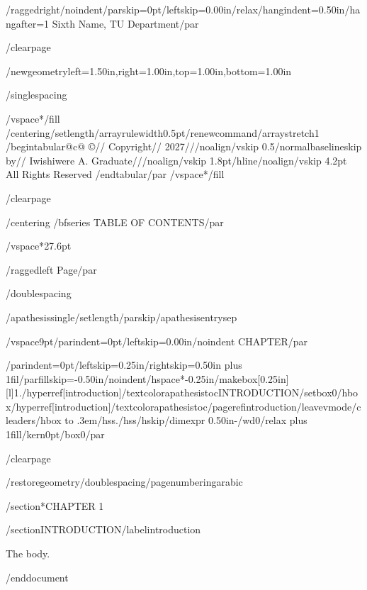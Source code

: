 {/raggedright/noindent/parskip=0pt/leftskip=0.00in/relax/hangindent=0.50in/hangafter=1
Sixth Name, TU Department/par}

/clearpage

/newgeometry{left=1.50in,right=1.00in,top=1.00in,bottom=1.00in}

/singlespacing

/vspace*{/fill}
{/centering/setlength{/arrayrulewidth}{0.5pt}/renewcommand{/arraystretch}{1}
/begin{tabular}{@{}c@{}}
©//
Copyright//
2027///noalign{/vskip 0.5/normalbaselineskip}
by//
Iwishiwere A. Graduate///noalign{/vskip 1.8pt}/hline/noalign{/vskip 4.2pt}
All Rights Reserved
/end{tabular}/par}
/vspace*{/fill}

/clearpage

{/centering
/bfseries TABLE OF CONTENTS/par}

/vspace*{27.6pt}

{/raggedleft
Page/par}

/doublespacing

{/apathesissingle/setlength{/parskip}{/apathesisentrysep}

/vspace{9pt}{/parindent=0pt/leftskip=0.00in/noindent CHAPTER/par}

{/parindent=0pt/leftskip=0.25in/rightskip=0.50in plus 1fil/parfillskip=-0.50in/noindent/hspace*{-0.25in}/makebox[0.25in][l]{1.}/hyperref[introduction]{/textcolor{apathesistoc}{INTRODUCTION}}/setbox0/hbox{/hyperref[introduction]{/textcolor{apathesistoc}{/pageref{introduction}}}}/leavevmode/cleaders/hbox to .3em{/hss./hss}/hskip/dimexpr 0.50in-/wd0/relax plus 1fill/kern0pt/box0/par}

}

/clearpage

/restoregeometry/doublespacing/pagenumbering{arabic}

/section*{CHAPTER 1}

/section{INTRODUCTION}/label{introduction}

The body.




/end{document}
